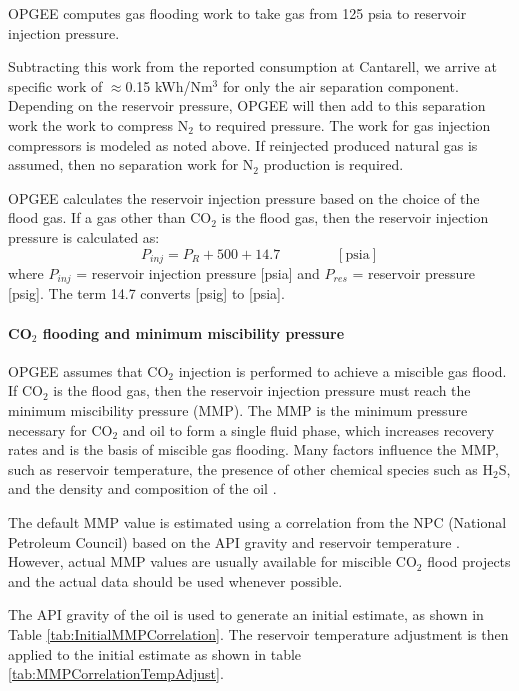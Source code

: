 \documentclass[11pt]{report}
\newcommand{\eqnunit}[1]{\quad\quad \scriptstyle{\left[\text{#1}\right]}}
\begin{document}
OPGEE computes gas flooding work to take gas from 125 psia to reservoir injection pressure. 

 Subtracting this work from the reported consumption at Cantarell, we arrive at specific work of $\approx$0.15 kWh/Nm$^3$ for only the air separation component. Depending on the reservoir pressure, OPGEE will then add to this separation work the work to compress N$_2$ to required pressure. The work for gas injection compressors is modeled as noted above. If reinjected produced natural gas is assumed, then no separation work for N$_2$ production is required.

OPGEE calculates the reservoir injection pressure based on the choice of the flood gas. If a gas other than CO$_2$ is the flood gas, then the reservoir injection pressure is calculated as:
\begin{equation} \label{eq:NONCO2ReservoirInjectionPressure}
P_{inj} = P_{R} + 500 + 14.7 \quad\quad\eqnunit{psia}
\end{equation}
where $P_{inj}$ = reservoir injection pressure [psia] and $P_{res}$ = reservoir pressure [psig]. The term 14.7 converts [psig] to [psia].



\paragraph{CO$_2$ flooding and minimum miscibility pressure}\label{par:CarbonDioxideMMP}
OPGEE assumes that CO$_2$ injection is performed to achieve a miscible gas flood. If CO$_2$ is the flood gas, then the reservoir injection pressure must reach the minimum miscibility pressure (MMP). The MMP is the minimum pressure necessary for CO$_2$ and oil to form a single fluid phase, which increases recovery rates and is the basis of miscible gas flooding. Many factors influence the MMP, such as reservoir temperature, the presence of other chemical species such as H$_2$S, and the density and composition of the oil  \cite{orr1987effect}. 

The default MMP value is estimated using a correlation from the NPC (National Petroleum Council) based on the API gravity and reservoir temperature \cite{NPC1976}. However, actual MMP values are usually available for miscible CO$_2$ flood projects and the actual data should be used whenever possible. 

The API gravity of the oil is used to generate an initial estimate, as shown in Table \ref{tab:InitialMMPCorrelation}. The reservoir temperature adjustment is then applied to the initial estimate as shown in table \ref{tab:MMPCorrelationTempAdjust}.
\end{document}
